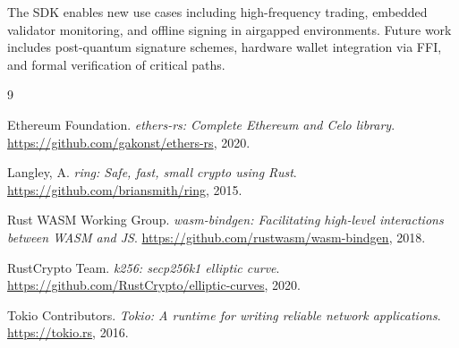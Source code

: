 \documentclass[11pt,twocolumn]{article}
\begin{document}
The SDK enables new use cases including high-frequency trading, embedded validator monitoring, and offline signing in airgapped environments. Future work includes post-quantum signature schemes, hardware wallet integration via FFI, and formal verification of critical paths.

\begin{thebibliography}{9}

Ethereum Foundation.
\textit{ethers-rs: Complete Ethereum and Celo library}.
\url{https://github.com/gakonst/ethers-rs}, 2020.

Langley, A.
\textit{ring: Safe, fast, small crypto using Rust}.
\url{https://github.com/briansmith/ring}, 2015.

Rust WASM Working Group.
\textit{wasm-bindgen: Facilitating high-level interactions between WASM and JS}.
\url{https://github.com/rustwasm/wasm-bindgen}, 2018.

RustCrypto Team.
\textit{k256: secp256k1 elliptic curve}.
\url{https://github.com/RustCrypto/elliptic-curves}, 2020.

Tokio Contributors.
\textit{Tokio: A runtime for writing reliable network applications}.
\url{https://tokio.rs}, 2016.

\end{thebibliography}
\end{document}
